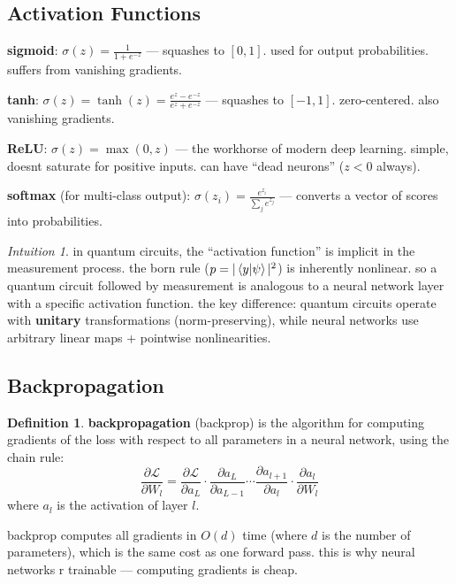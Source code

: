 \documentclass[11pt,a4paper]{article}
\theoremstyle{definition}
\newtheorem{definition}{Definition}[section]
\theoremstyle{remark}
\newtheorem*{intuition}{Intuition}
\begin{document}
\subsection{Activation Functions}

\textbf{sigmoid}: $\sigma(z) = \frac{1}{1 + e^{-z}}$ --- squashes to $[0, 1]$. used for output probabilities. suffers from vanishing gradients.

\textbf{tanh}: $\sigma(z) = \tanh(z) = \frac{e^z - e^{-z}}{e^z + e^{-z}}$ --- squashes to $[-1, 1]$. zero-centered. also vanishing gradients.

\textbf{ReLU}: $\sigma(z) = \max(0, z)$ --- the workhorse of modern deep learning. simple, doesnt saturate for positive inputs. can have ``dead neurons'' ($z < 0$ always).

\textbf{softmax} (for multi-class output): $\sigma(z_i) = \frac{e^{z_i}}{\sum_j e^{z_j}}$ --- converts a vector of scores into probabilities.

\begin{intuition}
in quantum circuits, the ``activation function'' is implicit in the measurement process. the born rule ($p = |\braket{y|\psi}|^2$) is inherently nonlinear. so a quantum circuit followed by measurement is analogous to a neural network layer with a specific activation function. the key difference: quantum circuits operate with \textbf{unitary} transformations (norm-preserving), while neural networks use arbitrary linear maps + pointwise nonlinearities.
\end{intuition}

\subsection{Backpropagation}

\begin{definition}
\textbf{backpropagation} (backprop) is the algorithm for computing gradients of the loss with respect to all parameters in a neural network, using the chain rule:
\[
\frac{\partial \mathcal{L}}{\partial W_l} = \frac{\partial \mathcal{L}}{\partial a_L} \cdot \frac{\partial a_L}{\partial a_{L-1}} \cdots \frac{\partial a_{l+1}}{\partial a_l} \cdot \frac{\partial a_l}{\partial W_l}
\]
where $a_l$ is the activation of layer $l$.
\end{definition}

backprop computes all gradients in $O(d)$ time (where $d$ is the number of parameters), which is the same cost as one forward pass. this is why neural networks r trainable --- computing gradients is cheap.
\end{document}
